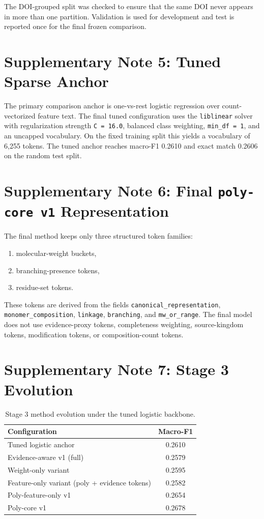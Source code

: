 \documentclass{article}
\begin{document}
The DOI-grouped split was checked to ensure that the same DOI never appears in more than one partition. Validation is used for development and test is reported once for the final frozen comparison.

\section{Supplementary Note 5: Tuned Sparse Anchor}

The primary comparison anchor is one-vs-rest logistic regression over count-vectorized feature text. The final tuned configuration uses the \texttt{liblinear} solver with regularization strength \texttt{C = 16.0}, balanced class weighting, \texttt{min\_df = 1}, and an uncapped vocabulary. On the fixed training split this yields a vocabulary of 6,255 tokens. The tuned anchor reaches macro-F1 0.2610 and exact match 0.2606 on the random test split.

\section{Supplementary Note 6: Final \texttt{poly-core v1} Representation}

The final method keeps only three structured token families:

\begin{enumerate}
\item molecular-weight buckets,
\item branching-presence tokens,
\item residue-set tokens.
\end{enumerate}

These tokens are derived from the fields \texttt{canonical\_representation}, \texttt{monomer\_composition}, \texttt{linkage}, \texttt{branching}, and \texttt{mw\_or\_range}. The final model does not use evidence-proxy tokens, completeness weighting, source-kingdom tokens, modification tokens, or composition-count tokens.

\section{Supplementary Note 7: Stage 3 Evolution}

\begin{table}[h]
\centering
\caption{Stage 3 method evolution under the tuned logistic backbone.}
\begin{tabular}{lc}
\toprule
Configuration & Macro-F1 \\
\midrule
Tuned logistic anchor & 0.2610 \\
Evidence-aware v1 (full) & 0.2579 \\
Weight-only variant & 0.2595 \\
Feature-only variant (poly + evidence tokens) & 0.2582 \\
Poly-feature-only v1 & 0.2654 \\
Poly-core v1 & 0.2678 \\
\bottomrule
\end{tabular}
\end{table}
\end{document}
